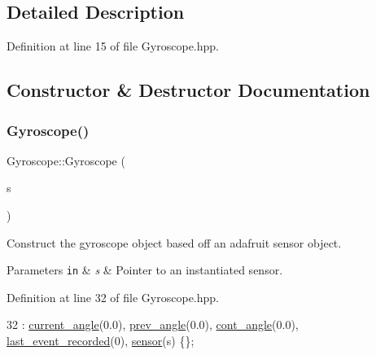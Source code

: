 \subsection{Detailed Description}


Definition at line 15 of file Gyroscope.\+hpp.



\subsection{Constructor \& Destructor Documentation}
\mbox{\label{class_gyroscope_a4bf061fd610528721de8c2e58827f590}} 
\subsubsection{\texorpdfstring{Gyroscope()}{Gyroscope()}}
{\footnotesize\ttfamily Gyroscope\+::\+Gyroscope (\begin{DoxyParamCaption}\item[{Adafruit\+\_\+\+B\+N\+O055 $\ast$}]{s }\end{DoxyParamCaption})\hspace{0.3cm}{\ttfamily [inline]}}



Construct the gyroscope object based off an adafruit sensor object. 


\begin{DoxyParams}[1]{Parameters}
\mbox{\tt in}  & {\em s} & Pointer to an instantiated sensor. \\
\hline
\end{DoxyParams}


Definition at line 32 of file Gyroscope.\+hpp.


\begin{DoxyCode}
32 : \hyperlink{class_gyroscope_a6da1957aa183ed0f0aabc6cd1ad85bf1}{current\_angle}(0.0), \hyperlink{class_gyroscope_a05294072cbb0e362975d3f0ad626b716}{prev\_angle}(0.0), \hyperlink{class_gyroscope_a1ed017e1e0767f70dfda902b858e04bc}{cont\_angle}(0.0), 
      \hyperlink{class_gyroscope_a8a6c3d747717b3bede6400c17a4696b6}{last\_event\_recorded}(0), \hyperlink{class_gyroscope_a7a8dacdbe6d1fcd8004fa62b0997e2bf}{sensor}(s) \{\};
\end{DoxyCode}
\mbox{\label{class_gyroscope_aa0e544848270a58f8c9466eb43910dd0}} 
